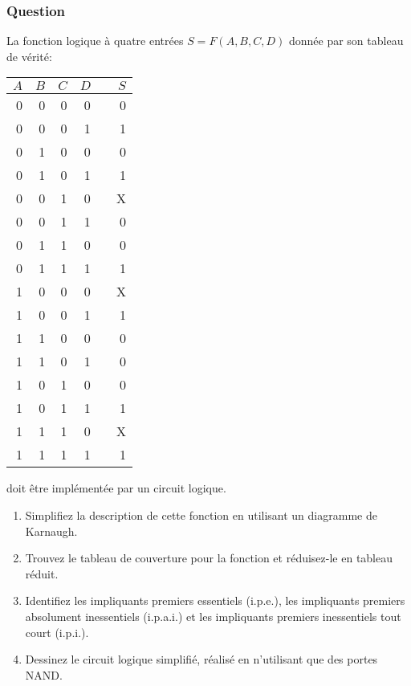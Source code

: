 \documentclass[11pt]{article}
\begin{document}
\subsubsection*{Question}
\label{sec:org46f8afe}
La fonction logique à quatre entrées \(S = F(A,B,C, D)\) donnée par son 
  tableau de vérité:
\begin{center}
\begin{tabular}{rrrrlr}
\(A\) & \(B\) & \(C\) & \(D\) &  & \(S\)\\[0pt]
\hline
0 & 0 & 0 & 0 &  & 0\\[0pt]
0 & 0 & 0 & 1 &  & 1\\[0pt]
0 & 1 & 0 & 0 &  & 0\\[0pt]
0 & 1 & 0 & 1 &  & 1\\[0pt]
0 & 0 & 1 & 0 &  & X\\[0pt]
0 & 0 & 1 & 1 &  & 0\\[0pt]
0 & 1 & 1 & 0 &  & 0\\[0pt]
0 & 1 & 1 & 1 &  & 1\\[0pt]
1 & 0 & 0 & 0 &  & X\\[0pt]
1 & 0 & 0 & 1 &  & 1\\[0pt]
1 & 1 & 0 & 0 &  & 0\\[0pt]
1 & 1 & 0 & 1 &  & 0\\[0pt]
1 & 0 & 1 & 0 &  & 0\\[0pt]
1 & 0 & 1 & 1 &  & 1\\[0pt]
1 & 1 & 1 & 0 &  & X\\[0pt]
1 & 1 & 1 & 1 &  & 1\\[0pt]
\end{tabular}
\end{center}
doit être implémentée par un circuit logique.

\begin{enumerate}
\item Simplifiez la description de cette fonction en utilisant un diagramme de Karnaugh.

\item Trouvez le tableau de couverture pour la fonction et réduisez-le en tableau réduit.

\item Identifiez les impliquants premiers essentiels (i.p.e.), les
impliquants premiers absolument inessentiels (i.p.a.i.) et les
impliquants premiers inessentiels tout court (i.p.i.).

\item Dessinez le circuit logique simplifié, réalisé en n'utilisant que des portes NAND.
\end{enumerate}
\end{document}
